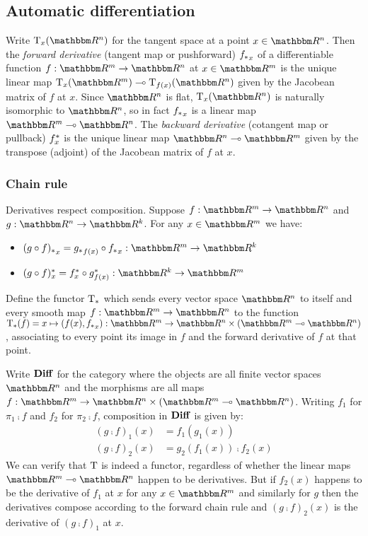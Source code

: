 \subsection{Automatic differentiation}

Write $\tangents_x(\RR^n)$ for the tangent space at a point $x \in \RR^n$. Then the \emph{forward derivative}
(tangent map or pushforward) ${f_{*}}_x$ of a differentiable function $f: \RR^m \to \RR^n$ at $x \in \RR^m$
is the unique linear map $\tangents_x(\RR^m) \linearto \tangents_{f(x)}(\RR^n)$ given by the Jacobean matrix
of $f$ at $x$. Since $\RR^n$ is flat, $\tangents_x(\RR^n)$ is naturally isomorphic to $\RR^n$, so in fact
${f_{*}}_x$ is a linear map $\RR^m \linearto \RR^n$. The \emph{backward derivative} (cotangent map or
pullback) $f^{*}_x$ is the unique linear map $\RR^n \linearto \RR^m$ given by the transpose (adjoint) of
the Jacobean matrix of $f$ at $x$.

\subsubsection{Chain rule}

Derivatives respect composition. Suppose $f: \RR^m \to \RR^n$ and $g: \RR^n \to \RR^k$. For any $x \in \RR^m$
we have:

\begin{itemize}
\item $\pushf{(g \comp f)}_x = \pushf{g}_{f(x)} \comp \pushf{f}_x: \RR^m \to \RR^k$
\item $\pullf{(g \comp f)}_x = \pullf{f}_{x} \comp \pullf{g}_{f(x)}: \RR^k \to \RR^m$
\end{itemize}

\begin{definition}
Define the functor $\mathrm{T}_*$ which sends every vector space $\RR^n$ to itself and every smooth map $f:
\RR^m \to \RR^n$ to the function $\tangents_*(f) = x \mapsto (f(x), \pushf{f}_x): \RR^m \to \RR^n \times (\RR^m
\linearto \RR^n)$, associating to every point its image in $f$ and the forward derivative of $f$ at that
point.
\end{definition}

Write $\mathbf{Diff}$ for the category where the objects are all finite vector spaces $\RR^n$ and the morphisms are
all maps $f: \RR^m \to \RR^n \times (\RR^m \linearto \RR^n)$. Writing $f_1$ for $\pi_1 \comp f$ and $f_2$ for
$\pi_2 \comp f$, composition in $\mathbf{Diff}$ is given by:
\begin{align*}
(g \comp f)_1(x) &= f_1(g_1(x)) \\
(g \comp f)_2(x) &= g_2(f_1(x)) \comp f_2(x)
\end{align*}
\noindent We can verify that $\mathrm{T}$ is indeed a functor, regardless of whether the linear maps $\RR^m
\linearto \RR^n$ happen to be derivatives. But if $f_2(x)$ happens to be the derivative of $f_1$ at $x$ for
any $x \in \RR^m$ and similarly for $g$ then the derivatives compose according to the forward chain rule and
$(g \comp f)_2(x)$ is the derivative of $(g \comp f)_1$ at $x$.


